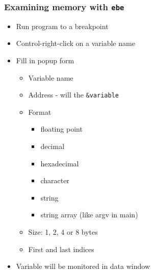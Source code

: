 \documentclass{beamer}
\begin{document}
\begin{frame}
    \frametitle{Examining memory with {\tt ebe}}
\begin{itemize}
    \item Run program to a breakpoint
    \item Control-right-click on a variable name
    \item Fill in popup form
    \begin{itemize}
        \item Variable name
        \item Address - will the {\tt \&variable}
        \item Format
        \begin{itemize}
              \item floating point
              \item decimal
              \item hexadecimal
              \item character
              \item string
              \item string array (like argv in main)
        \end{itemize}
        \item Size: 1, 2, 4 or 8 bytes
        \item First and last indices
    \end{itemize}
    \item Variable will be monitored in data window
\end{itemize}

\end{frame}
\end{document}
